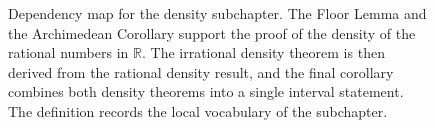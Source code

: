 \begin{figure}[H]
\begin{tikzpicture}[
    >=Latex,
    node distance=1.5cm and 0.6cm, %
    every node/.style={align=center}
]
\end{tikzpicture}

\begin{center}
\DependencyFigureLegend
\end{center}

\caption{Dependency map for the density subchapter. The Floor Lemma and the Archimedean Corollary support the proof of the density of the rational numbers in $\mathbb{R}$. The irrational density theorem is then derived from the rational density result, and the final corollary combines both density theorems into a single interval statement. The definition records the local vocabulary of the subchapter.}
\label{fig:density-dependency-map}
\end{figure}